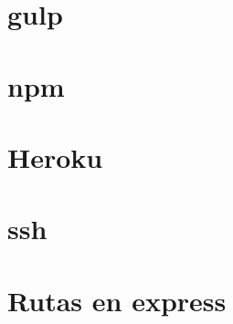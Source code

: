 \documentclass[]{article}
\begin{document}
\section{gulp}


\section{npm}


\section{Heroku}


%

\section{ssh}


\section{Rutas en express}


%

%
\end{document}
